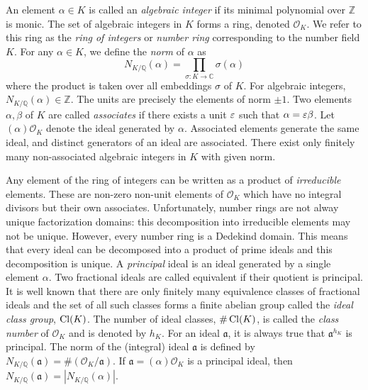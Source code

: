 An element $\alpha \in K$ is called an \textit{algebraic integer} if its minimal polynomial over $\mathbb{Z}$ is monic. The set of algebraic integers in $K$ forms a ring, denoted $\mathcal{O}_K$. We refer to this ring as the \textit{ring of integers} or \textit{number ring} corresponding to the number field $K$. For any $\alpha \in K$, we define the \textit{norm} of $\alpha$ as 
\[N_{K/\mathbb{Q}}(\alpha) = \prod_{\sigma:K \to \mathbb{C}} \sigma(\alpha)\]
where the product is taken over all embeddings $\sigma$ of $K$. For algebraic integers, $N_{K/\mathbb{Q}}(\alpha) \in \mathbb{Z}$. The units are precisely the elements of norm $\pm 1$. Two elements $\alpha, \beta$ of $K$ are called \textit{associates} if there exists a unit $\varepsilon$ such that $\alpha = \varepsilon \beta$. Let $(\alpha)\mathcal{O}_K$ denote the ideal generated by $\alpha$. Associated elements generate the same ideal, and distinct generators of an ideal are associated. There exist only finitely many non-associated algebraic integers in $K$ with given norm. 

Any element of the ring of integers can be written as a product of \textit{irreducible} elements. These are non-zero non-unit elements of $\mathcal{O}_K$ which have no integral divisors but their own associates. Unfortunately, number rings are not alway unique factorization domains: this decomposition into irreducible elements may not be unique. However, every number ring is a Dedekind domain. This means that every ideal can be decomposed into a product of prime ideals and this decomposition is unique. A \textit{principal} ideal is an ideal generated by a single element $\alpha$. Two fractional ideals are called equivalent if their quotient is principal. It is well known that there are only finitely many equivalence classes of fractional ideals and the set of all such classes forms a finite abelian group called the \textit{ideal class group}, $\operatorname{Cl}(K)$. The number of ideal classes, $\#\operatorname{Cl}(K)$, is called the \textit{class number} of $\mathcal{O}_K$ and is denoted by $h_K$. For an ideal $\mathfrak{a}$, it is always true that $\mathfrak{a}^{h_K}$ is principal. The norm of the (integral) ideal $\mathfrak{a}$ is defined by $N_{K/\mathbb{Q}}(\mathfrak{a}) = \#\left(\mathcal{O}_K/\mathfrak{a}\right)$. If $\mathfrak{a} = (\alpha) \mathcal{O}_K$ is a principal ideal, then $N_{K/\mathbb{Q}}(\mathfrak{a}) = \left|N_{K/\mathbb{Q}}(\alpha)\right|$. 

